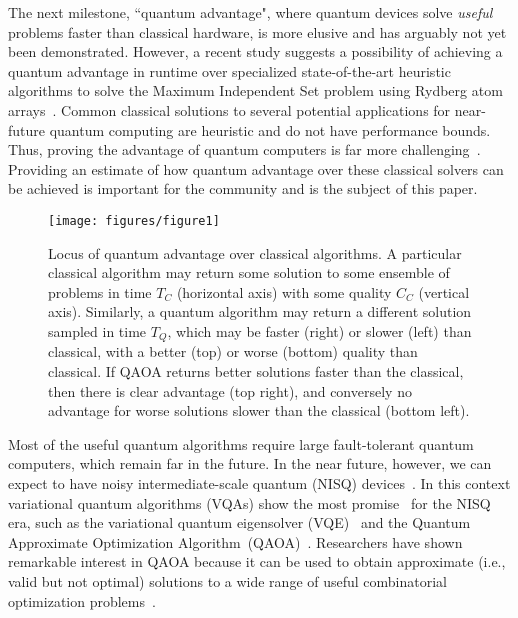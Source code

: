 \documentclass[prb,reprint,nofootinbib,longbibliography,superscriptaddress]{revtex4-1}
\begin{document}
The next milestone, ``quantum advantage", where quantum devices  solve \textit{useful} problems faster than classical hardware, is more elusive and has arguably not  yet been demonstrated. However, a recent study suggests a possibility of achieving a quantum advantage in runtime over specialized state-of-the-art heuristic algorithms to solve the Maximum Independent Set problem using Rydberg atom arrays~\cite{ebadi2022}.
Common classical solutions to several potential applications for near-future quantum computing are heuristic and do not have performance bounds. Thus,  proving the advantage of quantum computers is far more challenging~\cite{Guerreschi2019,Zhou2020,Serret2020}.
Providing an estimate of how quantum advantage over these classical solvers can be achieved is important for the community and is the subject of this paper.

\begin{figure}[h!t] %

    \centering
    \texttt{[image: figures/figure1]}
    \caption{Locus of quantum advantage over classical algorithms. A particular classical algorithm may return some solution to some ensemble of problems in time $T_C$ (horizontal axis) with some quality $C_C$ (vertical axis). Similarly, a quantum algorithm may return a different solution sampled in time $T_Q$, which may be faster (right) or slower (left) than classical, with a better (top) or worse (bottom) quality than classical. If QAOA returns better solutions faster than the classical, then there is clear advantage (top right), and conversely  no advantage for worse solutions slower than the classical (bottom left).}
    \label{fig:comparison_map}
\end{figure}

Most of the useful quantum algorithms require large fault-tolerant quantum computers, which remain far in the future. In the near future, however, we can expect to have noisy intermediate-scale quantum (NISQ) devices~\cite{Preskill2018}. 
In this context variational quantum algorithms (VQAs) show the most promise~\cite{VQA_overview} for the NISQ era, such as the variational quantum eigensolver (VQE)~\cite{peruzzo2014variational} and the Quantum Approximate Optimization Algorithm~(QAOA)~\cite{farhi2014quantum}.
Researchers have shown remarkable interest in QAOA because it can be used to obtain approximate (i.e., valid but not optimal) solutions to a wide range of useful combinatorial optimization problems~\cite{ebadi2022, farhi2020quantum, Chatterjee2021}.
\end{document}

